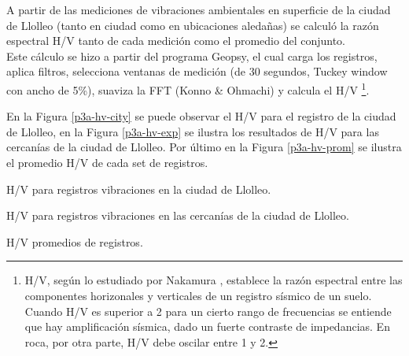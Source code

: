 A partir de las mediciones de vibraciones ambientales en superficie de la ciudad de Llolleo (tanto en ciudad como en ubicaciones aledañas) se calculó la razón espectral H/V tanto de cada medición como el promedio del conjunto. \\

Este cálculo se hizo a partir del programa Geopsy, el cual carga los registros, aplica filtros, selecciona ventanas de medición (de 30 segundos, Tuckey window con ancho de 5\%), suaviza la FFT (Konno \& Ohmachi) \cite{ref3} y calcula el H/V \footnote{H/V, según lo estudiado por Nakamura \cite{ref2}, establece la razón espectral entre las componentes horizonales y verticales de un registro sísmico de un suelo. Cuando H/V es superior a 2 para un cierto rango de frecuencias se entiende que hay amplificación sísmica, dado un fuerte contraste de impedancias. En roca, por otra parte, H/V debe oscilar entre 1 y 2.}.


En la Figura \ref{p3a-hv-city} se puede observar el H/V para el registro de la ciudad de Llolleo, en la Figura \ref{p3a-hv-exp} se ilustra los resultados de H/V para las cercanías de la ciudad de Llolleo. Por último en la Figura \ref{p3a-hv-prom} se ilustra el promedio H/V de cada set de registros.

\begin{images}[\label{p3a-hv-city}]{H/V para registros vibraciones en la ciudad de Llolleo.}
\end{images}

\begin{images}[\label{p3a-hv-exp}]{H/V para registros vibraciones en las cercanías de la ciudad de Llolleo.}
\end{images}

\begin{images}[\label{p3a-hv-prom}]{H/V promedios de registros.}
\end{images}

